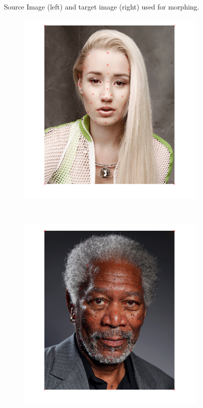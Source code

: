 \documentclass{paper}
\begin{document}
\begin{figure}[H]
\begin{subfigure}{0.45\textwidth}
    \end{subfigure}
    
    \caption{Source Image (left) and target image (right) used for morphing.}
    \label{fig:morphing_input}       
\end{figure}

\begin{figure}[H]
    \centering
    \begin{subfigure}{0.45\textwidth}
        \includegraphics[width=\textwidth]{morph/selected_features_source}
    \end{subfigure}
    ~
        \begin{subfigure}{0.45\textwidth}
        \includegraphics[width=\textwidth]{morph/selected_features_target}

\end{subfigure}
\end{figure}
\end{document}
